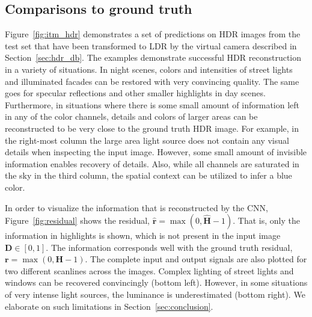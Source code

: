 \documentclass[acmtog]{acmart}
\newcommand{\figref}[1]{Figure~\ref{fig:#1}}
\newcommand{\secref}[1]{Section~\ref{sec:#1}}
\newcommand{\vect}[1]{\boldsymbol{#1}}
\newcommand{\hdrp}{H}
\newcommand{\rhdrp}{\hat{\hdrp}}
\newcommand{\ldrp}{D}
\newcommand{\hdr}{\vect{\hdrp}}
\newcommand{\rhdr}{\vect{\rhdrp}}
\newcommand{\ldr}{\vect{\ldrp}}
\newcommand\customsection[1]{\subsection{#1}}
\begin{document}
\customsection{Comparisons to ground truth}
\figref{itm_hdr} demonstrates a set of predictions on HDR images from the test set that have been transformed to LDR by the virtual camera described in \secref{hdr_db}. The examples demonstrate successful HDR reconstruction in a variety of situations.
In night scenes, colors and intensities of street lights and illuminated facades can be restored with very convincing quality. The same goes for specular reflections and other smaller highlights in day scenes. Furthermore, in situations where there is some small amount of information left in any of the color channels, details and colors of larger areas can be reconstructed to be very close to the ground truth HDR image. For example, in the right-most column the large area light source does not contain any visual details when inspecting the input image. However, some small amount of invisible information enables recovery of details. Also, while all channels are saturated in the sky in the third column, the spatial context can be utilized to infer a blue color.

In order to visualize the information that is reconstructed by the CNN, \figref{residual} shows the residual, $\vect{\hat{r}} = \max \left(0, \rhdr-1 \right)$. That is, only the information in highlights is shown, which is not present in the input image $\ldr \in [0, 1]$. The information corresponds well with the ground truth residual, $\vect{r} = \max \left(0, \hdr-1 \right)$. The complete input and output signals are also plotted for two different scanlines across the images. Complex lighting of street lights and windows can be recovered convincingly (bottom left). However, in some situations of very intense light sources, the luminance is underestimated (bottom right). We elaborate on such limitations in \secref{conclusion}.
\end{document}
